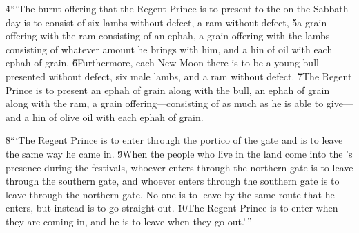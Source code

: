 \v{4}```The burnt offering that the Regent Prince is to present to the  on the Sabbath day is to consist of six lambs without defect, a ram without defect, \v{5}a grain offering with the ram consisting of an ephah, a grain offering with the lambs consisting of whatever amount he brings with him, and a hin of oil with each ephah of grain. \v{6}Furthermore, each New Moon there is to be a young bull presented without defect, six male lambs, and a ram without defect. \v{7}The Regent Prince is to present an ephah of grain along with the bull, an ephah of grain along with the ram, a grain offering---consisting of as much as he is able to give---and a hin of olive oil with each ephah of grain.

\v{8}```The Regent Prince is to enter through the portico of the gate and is to leave the same way he came in. \v{9}When the people who live in the land come into the 's presence during the festivals, whoever enters through the northern gate is to leave through the southern gate, and whoever enters through the southern gate is to leave through the northern gate. No one is to leave by the same route that he enters, but instead is to go straight out. \v{10}The Regent Prince is to enter when they are coming in, and he is to leave when they go out.'\,''

